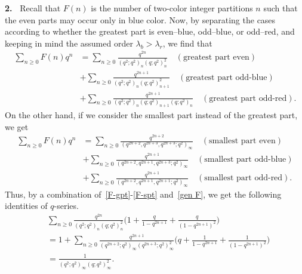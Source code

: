 \documentclass{amsart}
\numberwithin{equation}{section}
\theoremstyle{definition}
\newcommand{\fr}{\frac}
\begin{document}
{\bf 2.\ } Recall that $F(n)$ is the number of two-color integer partitions $n$
such that the even parts may occur only in blue color.
Now, by separating the cases according to whether the greatest part is even--blue, odd--blue, or odd--red,
and keeping in mind the assumed order $\lambda_b>\lambda_r$, we find that
\begin{align}
\sum_{n\geq 0} F(n)q^n &= \sum_{n\geq 0}\fr{q^{2n}}{(q^2;q^2)_n (q;q^2)_{n}^2}\quad (\text{greatest part even}) \nonumber \\
&+ \sum_{n\geq 0} \fr{q^{2n+1}}{(q^2;q^2)_n (q;q^2)_{n+1}^2} \quad (\text{greatest part odd-blue}) \nonumber \\
&+ \sum_{n\geq 0} \fr{q^{2n+1}}{(q^2;q^2)_n (q;q^2)_{n+1}(q;q^2)_{n}}\quad (\text{greatest part odd-red}).\label{F-gpt}
\end{align}
On the other hand, if we consider the smallest part instead of the greatest part, we get
\begin{align}
\sum_{n\geq 0} F(n)q^n &= \sum_{n\geq 0}\fr{q^{2n+2}}{(q^{2n+2},q^{2n+3},q^{2n+3};q^2)_{\infty}}\quad (\text{smallest part even}) \nonumber\\
&+ \sum_{n\geq 0} \fr{q^{2n+1}}{(q^{2n+2},q^{2n+1},q^{2n+3};q^2)_{\infty}} \quad (\text{smallest part odd-blue}) \nonumber\\
&+ \sum_{n\geq 0} \fr{q^{2n+1}}{(q^{2n+2},q^{2n+1},q^{2n+1};q^2)_{\infty}}
\quad (\text{smallest part odd-red}).\label{F-spt}
\end{align}
Thus, by a combination of~\eqref{F-gpt}-\eqref{F-spt} and~\eqref{gen F}, we get the following identities of $q$-series.
\begin{align}
&\sum_{n\geq 0}\fr{q^{2n}}{(q^2;q^2)_n (q;q^2)_{n}^2} \Big(1+\fr{q}{1-q^{2n+1}}+\fr{q}{(1-q^{2n+1})^2}\Big) \nonumber \\
&=1+\sum_{n\geq 0}\fr{q^{2n+1}}{(q^{2n+2};q^2)_\infty (q^{2n+3};q^2)_\infty^2} \Big(q+\fr{1}{1-q^{2n+1}}+\fr{1}{(1-q^{2n+1})^2}\Big) \nonumber \\
&=\fr{1}{(q^2;q^2)_\infty (q;q^2)_\infty^2} \label{gen F2}.
\end{align}
\end{document}
